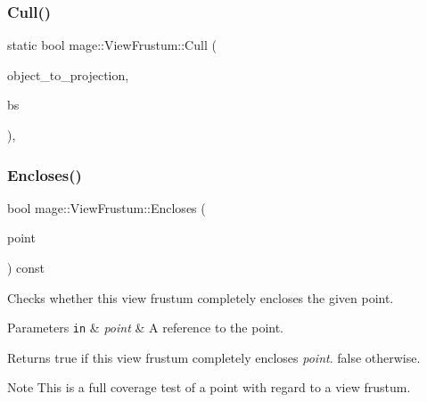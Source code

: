 \subsubsection{\texorpdfstring{Cull()}{Cull()}\hspace{0.1cm}{\footnotesize\ttfamily [2/2]}}
{\footnotesize\ttfamily static bool mage\+::\+View\+Frustum\+::\+Cull (\begin{DoxyParamCaption}\item[{F\+X\+M\+M\+A\+T\+R\+IX}]{object\+\_\+to\+\_\+projection,  }\item[{const \hyperlink{structmage_1_1_b_s}{BS} \&}]{bs }\end{DoxyParamCaption})\hspace{0.3cm}{\ttfamily [static]}, {\ttfamily [noexcept]}}

\hypertarget{structmage_1_1_view_frustum_a68e7b7915505d42de255ffb37b4beba3}{}\label{structmage_1_1_view_frustum_a68e7b7915505d42de255ffb37b4beba3} 
\subsubsection{\texorpdfstring{Encloses()}{Encloses()}\hspace{0.1cm}{\footnotesize\ttfamily [1/4]}}
{\footnotesize\ttfamily bool mage\+::\+View\+Frustum\+::\+Encloses (\begin{DoxyParamCaption}\item[{const \hyperlink{structmage_1_1_point3}{Point3} \&}]{point }\end{DoxyParamCaption}) const\hspace{0.3cm}{\ttfamily [noexcept]}}

Checks whether this view frustum completely encloses the given point.


\begin{DoxyParams}[1]{Parameters}
\mbox{\tt in}  & {\em point} & A reference to the point. \\
\hline
\end{DoxyParams}
\begin{DoxyReturn}{Returns}
{\ttfamily true} if this view frustum completely encloses {\itshape point}. {\ttfamily false} otherwise. 
\end{DoxyReturn}
\begin{DoxyNote}{Note}
This is a full coverage test of a point with regard to a view frustum. 
\end{DoxyNote}
\hypertarget{structmage_1_1_view_frustum_aba92d74f79b16d7ae656b2f271202d12}{}\label{structmage_1_1_view_frustum_aba92d74f79b16d7ae656b2f271202d12} 
